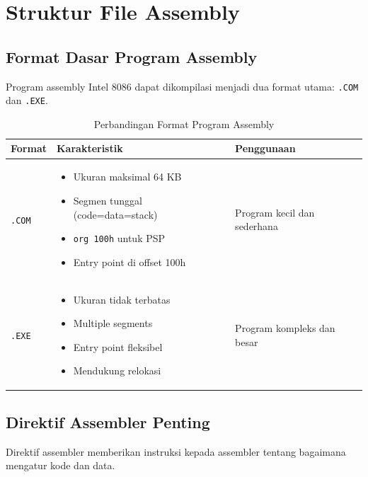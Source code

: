 \documentclass[../main.tex]{subfiles}
\begin{document}
\section{Struktur File Assembly}

\subsection{Format Dasar Program Assembly}
Program assembly Intel 8086 dapat dikompilasi menjadi dua format utama: \texttt{.COM} dan \texttt{.EXE}.

\begin{table}[h]
\centering
\caption{Perbandingan Format Program Assembly}
\begin{tabular}{|p{2cm}|p{6cm}|p{7cm}|}
\hline
\textbf{Format} & \textbf{Karakteristik} & \textbf{Penggunaan} \\
\hline
\texttt{.COM} & \begin{itemize}
\item Ukuran maksimal 64 KB
\item Segmen tunggal (code=data=stack)
\item \texttt{org 100h} untuk PSP
\item Entry point di offset 100h
\end{itemize} & Program kecil dan sederhana \\
\hline
\texttt{.EXE} & \begin{itemize}
\item Ukuran tidak terbatas
\item Multiple segments
\item Entry point fleksibel
\item Mendukung relokasi
\end{itemize} & Program kompleks dan besar \\
\hline
\end{tabular}
\label{tab:assembly-program-formats}
\end{table}

\subsection{Direktif Assembler Penting}
Direktif assembler memberikan instruksi kepada assembler tentang bagaimana mengatur kode dan data.
\end{document}
